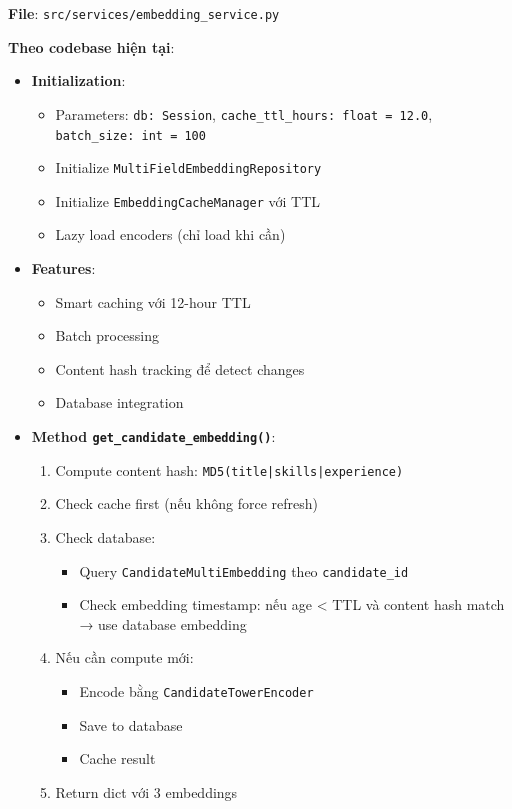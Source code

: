 \textbf{File}: \texttt{src/services/embedding\_service.py}

\textbf{Theo codebase hiện tại}:

\begin{itemize}
    \item \textbf{Initialization}:
    \begin{itemize}
        \item Parameters: \texttt{db: Session}, \texttt{cache\_ttl\_hours: float = 12.0}, \texttt{batch\_size: int = 100}
        \item Initialize \texttt{MultiFieldEmbeddingRepository}
        \item Initialize \texttt{EmbeddingCacheManager} với TTL
        \item Lazy load encoders (chỉ load khi cần)
    \end{itemize}
    
    \item \textbf{Features}:
    \begin{itemize}
        \item Smart caching với 12-hour TTL
        \item Batch processing
        \item Content hash tracking để detect changes
        \item Database integration
    \end{itemize}
    
    \item \textbf{Method \texttt{get\_candidate\_embedding()}}:
    \begin{enumerate}
        \item Compute content hash: \texttt{MD5(title|skills|experience)}
        \item Check cache first (nếu không force refresh)
        \item Check database:
        \begin{itemize}
            \item Query \texttt{CandidateMultiEmbedding} theo \texttt{candidate\_id}
            \item Check embedding timestamp: nếu age < TTL và content hash match → use database embedding
        \end{itemize}
        \item Nếu cần compute mới:
        \begin{itemize}
            \item Encode bằng \texttt{CandidateTowerEncoder}
            \item Save to database
            \item Cache result
        \end{itemize}
        \item Return dict với 3 embeddings
    \end{enumerate}
    

\end{itemize}
